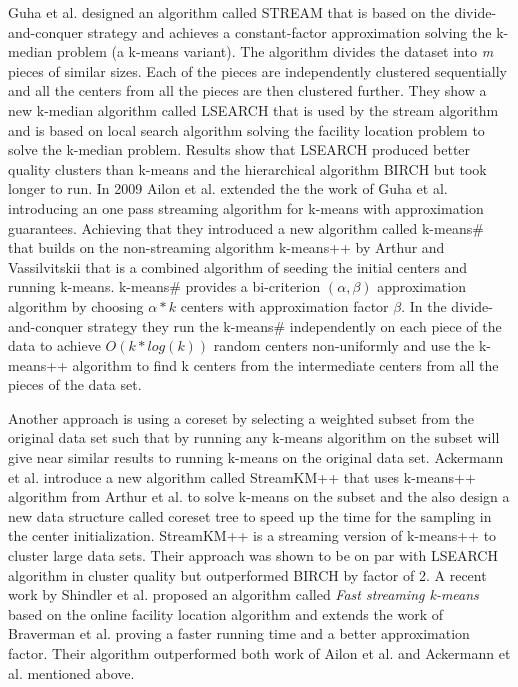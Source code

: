 Guha et al. \citep{Guha:2003} designed an algorithm called STREAM that is based on the divide-and-conquer strategy and achieves a constant-factor approximation solving the k-median problem (a k-means variant). The algorithm divides the dataset into \textit{m} pieces of similar sizes. Each of the pieces are independently clustered sequentially and all the centers from all the pieces are then clustered further. They show a new k-median algorithm called LSEARCH that is used by the stream algorithm and is based on local search algorithm solving the facility location problem \citep{Charikar:1999} to solve the k-median problem. Results show that LSEARCH produced better quality clusters than k-means and the hierarchical algorithm BIRCH \citep{Zhang:1996} but took longer to run. In 2009 Ailon et al. \citep{Ailon:2009} extended the the work of Guha et al. introducing an one pass streaming algorithm for k-means with approximation guarantees. Achieving that they introduced a new algorithm called k-means\# that builds on the non-streaming algorithm k-means++ by Arthur and Vassilvitskii \citep{Arthur:2007} that is a combined algorithm of seeding the initial centers and running k-means. k-means\# provides a bi-criterion $ (\alpha,\beta) $ approximation algorithm by choosing $\alpha * k $ centers with approximation factor $\beta$. In the divide-and-conquer strategy they run the k-means\# independently on each piece of the data to achieve $O(k * log(k))$ random centers non-uniformly and use the k-means++ algorithm to find k centers from the intermediate centers from all the pieces of the data set. 

Another approach is using a coreset by selecting a weighted subset from the original data set such that by running any k-means algorithm on the subset will give near similar results to running k-means on the original data set. Ackermann et al. \citep{Ackermann:2010} introduce a new algorithm called StreamKM++ that uses k-means++ algorithm from Arthur et al. \citep{Arthur:2007} to solve k-means on the subset and the also design a new data structure called coreset tree to speed up the time for the sampling in the center initialization. StreamKM++ is a streaming version of k-means++ to cluster large data sets. Their approach was shown to be on par with LSEARCH algorithm in cluster quality but outperformed BIRCH by factor of 2. A recent work by Shindler et al. \citep{Shindler:2011} proposed an algorithm called \textit{Fast streaming k-means} based on the online facility location algorithm \citep{Meyerson:2001} and extends the work of Braverman et al. \citep{Braverman:2011} proving a faster running time and a better approximation factor. Their algorithm outperformed both work of Ailon et al. \citep{Ailon:2009} and Ackermann et al. \citep{Ackermann:2010} mentioned above.

